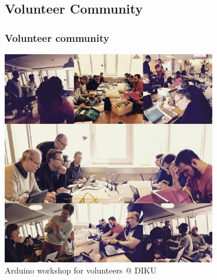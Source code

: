 \documentclass{beamer}
\begin{document}
\subsection{Volunteer Community}
\begin{frame}
  \frametitle{Volunteer community}
  \begin{center}
    \includegraphics[width=0.7\textwidth]{imagery/2016-01-arduino-dag_DIKU.jpg}\\
    Arduino workshop for volunteers @ DIKU
  \end{center}

\end{frame}



\end{document}
